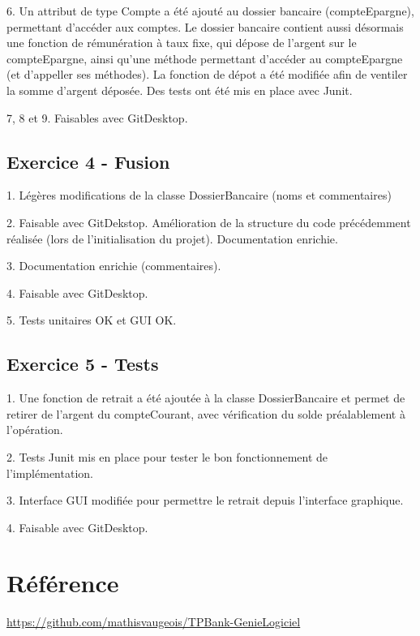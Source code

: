 \documentclass{article}
\begin{document}
6.
Un attribut de type Compte a été ajouté au dossier bancaire (compteEpargne), permettant d'accéder aux comptes. Le dossier bancaire
contient aussi désormais une fonction de rémunération à taux fixe, qui dépose de l'argent sur le compteEpargne, ainsi qu'une méthode permettant d'accéder au compteEpargne (et d'appeller ses méthodes). La fonction de dépot a été modifiée afin de ventiler la somme d'argent déposée. Des tests ont été mis en place avec Junit.

7, 8 et 9.
Faisables avec GitDesktop.

\subsection{Exercice 4 - Fusion}

1.
Légères modifications de la classe DossierBancaire (noms et commentaires)

2.
Faisable avec GitDekstop. Amélioration de la structure du code précédemment réalisée (lors de l'initialisation du projet). Documentation enrichie.

3.
Documentation enrichie (commentaires).

4.
Faisable avec GitDesktop. 

5.
Tests unitaires OK et GUI OK.

\subsection{Exercice 5 - Tests}

1.
Une fonction de retrait a été ajoutée à la classe DossierBancaire et permet de retirer de l'argent du compteCourant, avec vérification du 
solde préalablement à l'opération.

2.
Tests Junit mis en place pour tester le bon fonctionnement de l'implémentation.

3.
Interface GUI modifiée pour permettre le retrait depuis l'interface graphique.

4.
Faisable avec GitDesktop.

\newpage
\section*{Référence}




\url{https://github.com/mathisvaugeois/TPBank-GenieLogiciel}
\end{document}
